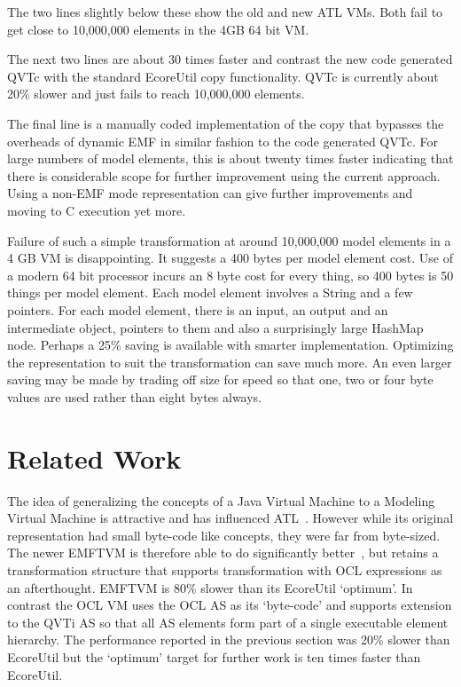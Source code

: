 \documentclass{llncs}
\begin{document}
The two lines slightly below these show the old and new ATL VMs. Both fail to get close to 10,000,000 elements in the 4GB 64 bit VM.

The next two lines are about 30 times faster and contrast the new code generated QVTc with the standard EcoreUtil copy functionality. QVTc is currently about 20\% slower and just fails to reach 10,000,000 elements.

The final line is a manually coded implementation of the copy that bypasses the overheads of dynamic EMF in similar fashion to the code generated QVTc. For large numbers of model elements,
this is about twenty times faster indicating that there is considerable scope for further improvement using the current approach. Using a non-EMF mode representation can give further improvements and moving to C execution yet more.

Failure of such a simple transformation at around 10,000,000 model elements in a 4 GB VM is disappointing. It suggests a 400 bytes per model element cost. Use of a modern 64 bit processor incurs an 8 byte cost for every thing, so 400 bytes is 50 things per model element. Each model element involves a String and a few pointers. For each model element, there is an input, an output and an intermediate object, pointers to them and also a surprisingly large HashMap node. Perhaps a 25\% saving is available with smarter implementation. Optimizing the representation to suit the transformation can save much more. An even larger saving may be made by trading off size for speed so that one, two or four byte values are used rather than eight bytes always.

\section{Related Work}\label{Related Work}

The idea of generalizing the concepts of a Java Virtual Machine to a Modeling Virtual Machine is attractive and has influenced ATL~\cite{Eclipse-ATL}. However while its original representation had small byte-code like concepts, they were far from byte-sized. The newer EMFTVM  is therefore able to do significantly better~\cite{EMFTVM-performance}, but retains a transformation structure that supports transformation with OCL expressions as an afterthought. EMFTVM is 80\% slower than its EcoreUtil `optimum'. In contrast the OCL VM uses the OCL AS as its `byte-code' and supports extension to the QVTi AS so that all AS elements form part of a single executable element hierarchy. The performance reported in the previous section was 20\% slower than EcoreUtil but the `optimum' target for further work is ten times faster than EcoreUtil. 
\end{document}
